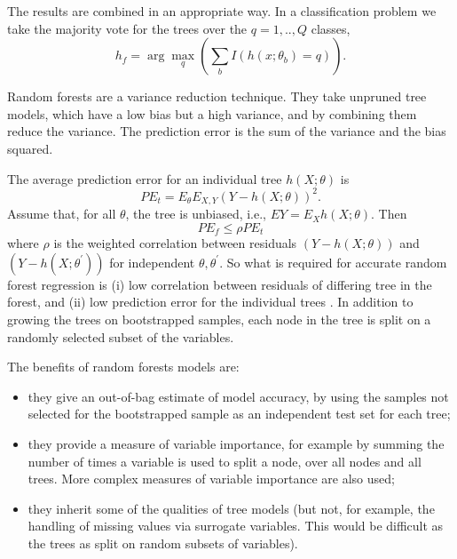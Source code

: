 \documentclass[10pt,a4paper]{article}  %
\begin{document}
The results are combined in an appropriate way. In a classification problem we take the majority vote for the trees over
the $q=1,..,Q$ classes,
\begin{equation*}
{{h_f}}=  \arg \max_q \left(\sum_b I(h(x;\theta_b)=q)\right).
\end{equation*}

Random forests are a variance reduction technique. They take unpruned tree models, which have a low bias but a high
variance, and by combining them reduce the variance. The prediction error is the sum of the variance and the bias
squared.

The average prediction error for an individual tree $h(X; \theta)$ is
\begin{equation}
PE_t = E_\theta E_{X,Y} (Y-h(X; \theta))^2.
\end{equation}
Assume that, for all  $\theta$, the tree is unbiased, i.e., $EY= E_X h(X; \theta)$. Then
\begin{equation}
PE_f \leq \rho PE_t
\end{equation}
where $\rho$ is the weighted correlation between residuals $(Y-h(X;\theta))$ and $(Y-h(X;\theta^\prime))$ for independent $\theta,
\theta^\prime$.  
So what is required for  accurate random forest regression is (i) low correlation between residuals of differing tree in
the forest, and (ii) low prediction error for the individual trees \cite{Segal.2004}. In addition to growing the trees
on  bootstrapped samples, each node in the tree is split on a randomly selected subset of the variables.

The benefits of random forests models are:
  \begin{itemize}
  \item they give an out-of-bag estimate of model accuracy, by using the samples not selected for the bootstrapped sample
    as an independent test set for each tree;
  \item they provide a measure of variable importance, for example by summing the number of times a variable is used to
    split a node, over all nodes and all trees. More complex measures of variable importance are also used;
  \item they inherit some of the qualities of tree models (but not, for example, the handling of missing values via surrogate
    variables. This would be difficult as the trees as split on random subsets of variables).
  \end{itemize}
\end{document}
